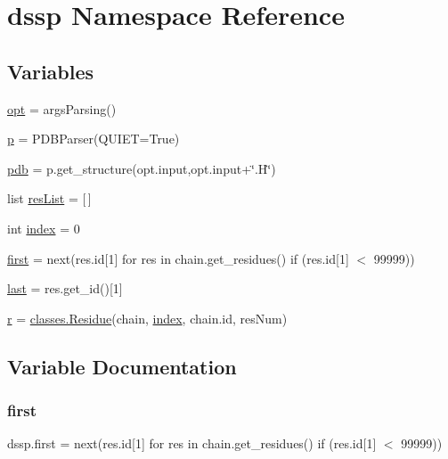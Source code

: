 \hypertarget{namespacedssp}{}\section{dssp Namespace Reference}
\label{namespacedssp}
\subsection*{Variables}
\begin{DoxyCompactItemize}
\item 
\hyperlink{namespacedssp_ab0751bd09021bc7957338761ef46a04c}{opt} = args\+Parsing()
\item 
\hyperlink{namespacedssp_a83b8f32debef91921c85dcc1041461b7}{p} = P\+D\+B\+Parser(Q\+U\+I\+ET=True)
\item 
\hyperlink{namespacedssp_a7c965741c59ff88746dfe7b24225f5b6}{pdb} = p.\+get\+\_\+structure(opt.\+input,opt.\+input+\char`\"{}.H\char`\"{})
\item 
list \hyperlink{namespacedssp_a0437a710ae9bafa770b3c8cf7ff1ac9c}{res\+List} = \mbox{[}$\,$\mbox{]}
\item 
int \hyperlink{namespacedssp_a2570d614feb77a7f9dda56d1e990a944}{index} = 0
\item 
\hyperlink{namespacedssp_ae5b8dfaff33b5a3fe6a747b24f41cdb6}{first} = next(res.\+id\mbox{[}1\mbox{]} for res in chain.\+get\+\_\+residues() if (res.\+id\mbox{[}1\mbox{]} $<$ 99999))
\item 
\hyperlink{namespacedssp_a2d834d7b7152a23667087f9d42776e8c}{last} = res.\+get\+\_\+id()\mbox{[}1\mbox{]}
\item 
\hyperlink{namespacedssp_a6c9b37095b15b7e996a95db1954568a3}{r} = \hyperlink{classclasses_1_1Residue}{classes.\+Residue}(chain, \hyperlink{namespacedssp_a2570d614feb77a7f9dda56d1e990a944}{index}, chain.\+id, res\+Num)
\end{DoxyCompactItemize}


\subsection{Variable Documentation}
\mbox{\label{namespacedssp_ae5b8dfaff33b5a3fe6a747b24f41cdb6}} 
\subsubsection{\texorpdfstring{first}{first}}
{\footnotesize\ttfamily dssp.\+first = next(res.\+id\mbox{[}1\mbox{]} for res in chain.\+get\+\_\+residues() if (res.\+id\mbox{[}1\mbox{]} $<$ 99999))}


